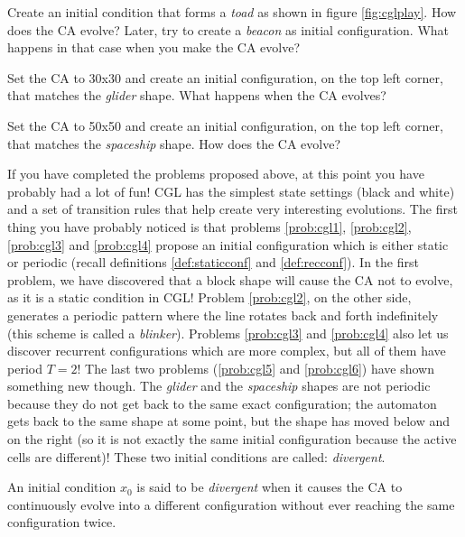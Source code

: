 \begin{problem}
\label{prob:cgl4}
Create an initial condition that forms a \textit{toad} as shown in figure \ref{fig:cglplay}.
How does the CA evolve?
Later, try to create a \textit{beacon} as initial configuration. What happens in that
case when you make the CA evolve?
\end{problem}

\begin{problem}
\label{prob:cgl5}
Set the CA to 30x30 and create an initial configuration, on the top left corner, that
matches the \textit{glider} shape. What happens when the CA evolves?
\end{problem}

\begin{problem}
\label{prob:cgl6}
Set the CA to 50x50 and create an initial configuration, on the top left corner, that
matches the \textit{spaceship} shape. How does the CA evolve?
\end{problem}

If you have completed the problems proposed above, at this point you have probably had
a lot of fun! CGL has the simplest state settings (black and white) and a set of
transition rules that help create very interesting evolutions. The first thing you have probably
noticed is that problems \ref{prob:cgl1}, \ref{prob:cgl2}, \ref{prob:cgl3} and \ref{prob:cgl4}
propose an initial configuration which is either static or periodic (recall definitions
\ref{def:staticconf} and \ref{def:recconf}). 
In the first problem, we have discovered that a block shape will cause the CA not to evolve,
as it is a static condition in CGL!
Problem \ref{prob:cgl2}, on the other side, generates a periodic pattern where the line rotates
back and forth indefinitely (this scheme is called a \textit{blinker}). Problems
\ref{prob:cgl3} and \ref{prob:cgl4} also let us discover recurrent configurations which are more
complex, but all of them have period $T=2$!
The last two problems (\ref{prob:cgl5} and \ref{prob:cgl6}) have shown something new though. The
\textit{glider} and the \textit{spaceship} shapes are not periodic because they do not get back
to the same exact configuration; the automaton gets back to the same shape at some point,
but the shape has moved below and on the right (so it is not exactly the same initial
configuration because the active cells are different)!
These two initial conditions are called: \textit{divergent}.

\begin{definition}
\label{def:divconf}
An initial condition $x_0$ is said to be
\textit{divergent} when it causes the CA to continuously evolve
into a different configuration without ever reaching the same configuration twice.
\end{definition}

